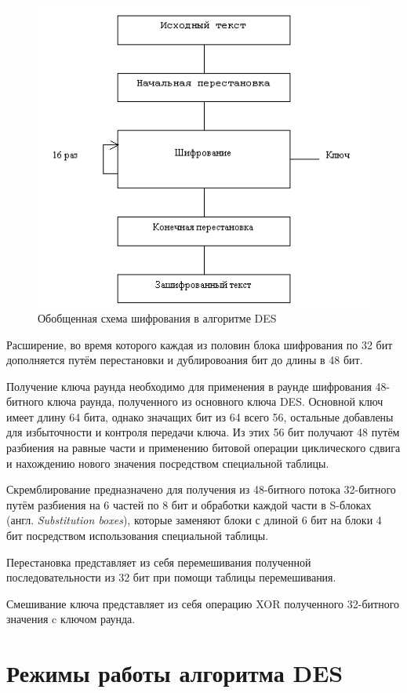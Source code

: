 \begin{figure}[ht!]
	\centering
	\includegraphics[width=0.7\linewidth]{img/des.png}
	\caption{Обобщенная схема шифрования в алгоритме DES}
	\label{fig:des}
\end{figure}

Расширение, во время которого каждая из половин блока шифрования по 32 бит дополняется путём перестановки и дублировоания бит до длины в 48 бит.

Получение ключа раунда необходимо для применения в раунде шифрования 48-битного ключа раунда, полученного из основного ключа DES. Основной ключ имеет длину 64 бита, однако значащих бит из 64 всего 56, остальные добавлены для избыточности и контроля передачи ключа. Из этих 56 бит получают 48 путём разбиения на равные части и применению битовой операции циклического сдвига и нахождению нового значения посредством специальной таблицы.

Скремблирование предназначено для получения из 48-битного потока 32-битного путём разбиения на 6 частей по 8 бит и обработки каждой части в S-блоках (англ. \textit{Substitution boxes}), которые заменяют блоки с длиной 6 бит на блоки 4 бит посредством использования специальной таблицы.

Перестановка представляет из себя перемешивания полученной последовательности из 32 бит при помощи таблицы перемешивания.

Смешивание ключа представляет из себя операцию XOR полученного 32-битного значения c ключом раунда.

\section{Режимы работы алгоритма DES}

